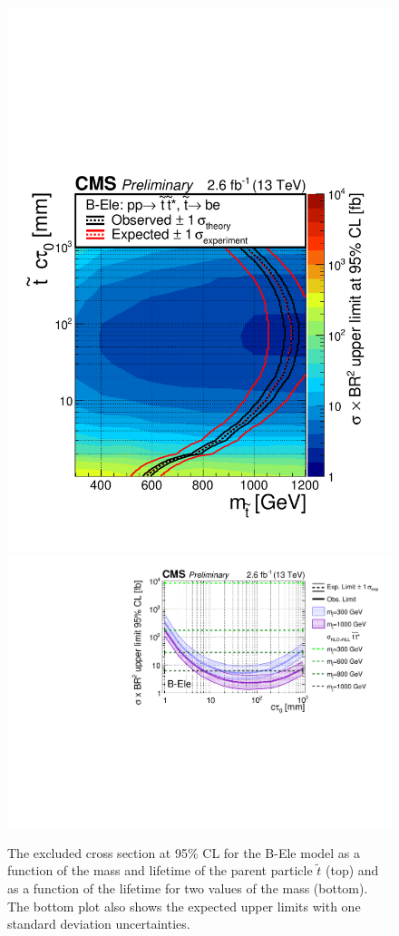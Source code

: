 \begin{figure}[tb]
\begin{center}
\includegraphics[width=.75\textwidth]{figures/pas//RESULT/UNBLINDED_LIMITS/B-Ele2D.pdf}
\includegraphics[width=.85\textwidth]{figures/pas//RESULT/UNBLINDED_LIMITS/B-Ele.pdf}
\caption{ The excluded cross section at 95\% CL for the B-Ele model as
  a function of the mass and lifetime of the parent particle
  $\tilde{t}$ (top) and as a function of the lifetime for two values
  of the mass (bottom).  The bottom plot also shows the expected upper
  limits with one standard deviation
  uncertainties.\label{fig:dsusy_limit_ele}}
\end{center}
\end{figure}

